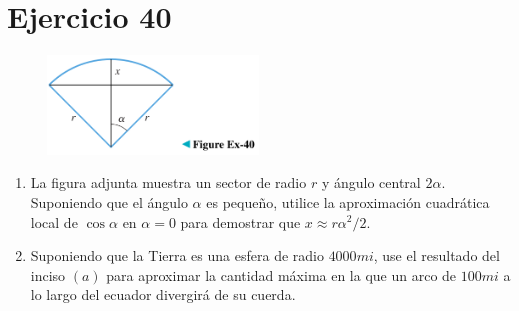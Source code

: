 \documentclass[12pt]{article}
\begin{document}
\section{Ejercicio 40}
\begin{figure}[h!]
\centering
\includegraphics[width=0.5\textwidth]{../img/img_Lista2/2_40.png}
\end{figure}
\begin{enumerate}[label=(\alph*)]
\item La figura adjunta muestra un sector de radio $r$ y ángulo central $2 \alpha$. Suponiendo que el ángulo $\alpha$ es pequeño, utilice la aproximación cuadrática local de $\cos \alpha$ en $\alpha = 0$ para demostrar que $x \approx r \alpha ^2/2$.
\item Suponiendo que la Tierra es una esfera de radio $4000 mi$, use el resultado del inciso $(a)$ para aproximar la cantidad máxima en la que un arco de $100 mi$ a lo largo del ecuador divergirá de su cuerda.
\end{enumerate}
\end{document}
